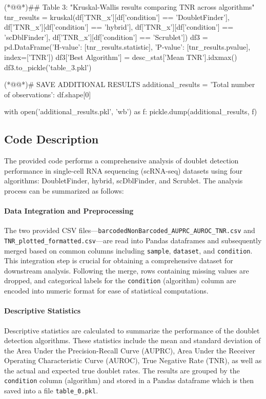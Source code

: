 \documentclass[11pt]{article}
\begin{document}
\begin{python}
(*@@*)## Table 3: "Kruskal-Wallis results comparing TNR across algorithms"
tnr_results = kruskal(df['TNR_x'][df['condition'] == 'DoubletFinder'],
                      df['TNR_x'][df['condition'] == 'hybrid'],
                      df['TNR_x'][df['condition'] == 'scDblFinder'],
                      df['TNR_x'][df['condition'] == 'Scrublet'])
df3 = pd.DataFrame({'H-value': [tnr_results.statistic], 'P-value': [tnr_results.pvalue]}, index=['TNR'])
df3['Best Algorithm'] = desc_stat['Mean TNR'].idxmax()
df3.to_pickle('table_3.pkl')

(*@@*)# SAVE ADDITIONAL RESULTS
additional_results = {
    'Total number of observations': df.shape[0]
}

with open('additional_results.pkl', 'wb') as f:
    pickle.dump(additional_results, f)

\end{python}

\subsection{Code Description}

The provided code performs a comprehensive analysis of doublet detection performance in single-cell RNA sequencing (scRNA-seq) datasets using four algorithms: DoubletFinder, hybrid, scDblFinder, and Scrublet. The analysis process can be summarized as follows:

\paragraph{Data Integration and Preprocessing}
The two provided CSV files—\texttt{barcodedNonBarcoded\_AUPRC\_AUROC\_TNR.csv} and \texttt{TNR\_plotted\_formatted.csv}—are read into Pandas dataframes and subsequently merged based on common columns including \texttt{sample}, \texttt{dataset}, and \texttt{condition}. This integration step is crucial for obtaining a comprehensive dataset for downstream analysis. Following the merge, rows containing missing values are dropped, and categorical labels for the \texttt{condition} (algorithm) column are encoded into numeric format for ease of statistical computations.

\paragraph{Descriptive Statistics}
Descriptive statistics are calculated to summarize the performance of the doublet detection algorithms. These statistics include the mean and standard deviation of the Area Under the Precision-Recall Curve (AUPRC), Area Under the Receiver Operating Characteristic Curve (AUROC), True Negative Rate (TNR), as well as the actual and expected true doublet rates. The results are grouped by the \texttt{condition} column (algorithm) and stored in a Pandas dataframe which is then saved into a file \texttt{table\_0.pkl}.
\end{document}
